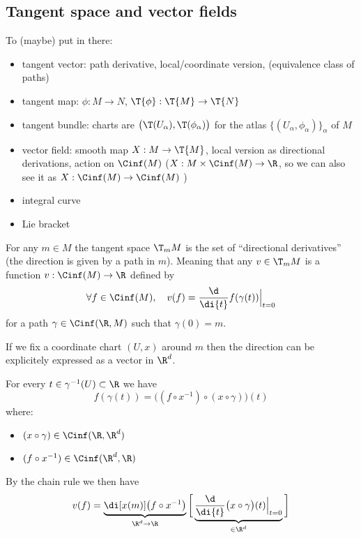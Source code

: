 	\subsection{Tangent space and vector fields}

		To (maybe) put in there:
		\begin{itemize}
			\item tangent vector: path derivative, local/coordinate version, (equivalence class of paths)
			\item tangent map: $\phi: M \to N$, $\T{\phi}: \T{M} \to \T{N}$
			\item tangent bundle: charts are $\big( \T(U_\alpha), \T(\phi_\alpha) \big)$ for the atlas $\big\{ (U_\alpha, \phi_\alpha) \big\}_\alpha$ of $M$
			\item vector field: smooth map $X: M \to \T{M}$, local version as directional derivations, action on $\Cinf(M)$ ($X: M \times \Cinf(M) \to \R$, so we can also see it as $X: \Cinf(M) \to \Cinf(M)$ )
			\item integral curve
			\item Lie bracket
		\end{itemize}

		For any $m \in M$ the tangent space $\T_m{M}$ is the set of ``directional derivatives'' (the direction is given by a path in $m$).
		Meaning that any $v \in \T_m{M}$ is a function $v: \Cinf(M) \to \R$ defined by
		$$
			\forall f \in \Cinf(M), \quad v(f) = \frac{\d}{\di{t}} f(\gamma(t)) \Big|_{t=0}
		$$
		for a path $\gamma \in \Cinf(\R, M)$ such that $\gamma(0) = m$.



		If we fix a coordinate chart $(U, x)$ around $m$ then the direction can be explicitely expressed as a vector in $\R^d$.

		For every $t \in \gamma^{-1}(U) \subset \R$ we have
		$$
			f(\gamma(t)) = \big( (f \circ x^{-1}) \circ (x \circ \gamma) \big)(t)
		$$
		where:
		\begin{itemize}
			\item $(x \circ \gamma) \in \Cinf(\R, \R^d)$
			\item $(f \circ x^{-1}) \in \Cinf(\R^d, \R)$
		\end{itemize}
		By the chain rule we then have
		$$
			v(f) = \underbrace{\di[x(m)] \big( f \circ x^{-1} \big)}_{\R^d \to \R} \bigg[ \underbrace{\frac{\d}{\di{t}} \big( x \circ \gamma \big)(t) \Big|_{t=0}}_{\in \R^d} \bigg]
		$$

